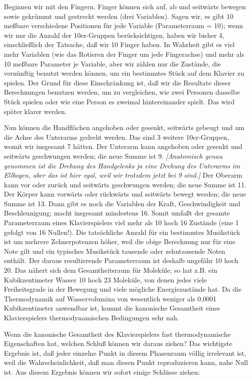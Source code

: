 Beginnen wir mit den Fingern.
Finger können sich auf, ab und seitwärts bewegen sowie gekrümmt und gestreckt werden (drei Variablen).
Sagen wir, es gibt 10 meßbare verschiedene Positionen für jede Variable (Parameterraum = 10); wenn wir nur die Anzahl der 10er-Gruppen berücksichtigen, haben wir bisher 4, einschließlich der Tatsache, daß wir 10 Finger haben.
In Wahrheit gibt es viel mehr Variablen (wie das Rotieren der Finger um jede Fingerachse) und mehr als 10 meßbare Parameter je Variable, aber wir zählen nur die Zustände, die vernünftig benutzt werden können, um ein bestimmtes Stück auf dem Klavier zu spielen.
Der Grund für diese Einschränkung ist, daß wir die Resultate dieser Berechnungen benutzen werden, um zu vergleichen, wie zwei Personen dasselbe Stück spielen oder wie eine Person es zweimal hintereinander spielt.
Das wird später klarer werden.

Nun können die Handflächen angehoben oder gesenkt, seitwärts gebeugt und um die Achse des Unterarms gedreht werden.
Das sind 3 weitere 10er-Gruppen, womit wir insgesamt 7 hätten.
Der Unterarm kann angehoben oder gesenkt und seitwärts geschwungen werden; die neue Summe ist 9.
\textit{[Anatomisch genau genommen ist die Drehung des Handgelenks ja eine Drehung des Unterarms im Ellbogen, aber das ist hier egal, weil wir trotzdem jetzt bei 9 sind.]}
Der Oberarm kann vor oder zurück und seitwärts geschwungen werden; die neue Summe ist 11.
Der Körper kann vorwärts oder rückwärts und seitwärts bewegt werden; die neue Summe ist 13.
Dann gibt es noch die Variablen der Kraft, Geschwindigkeit und Beschleunigung; macht insgesamt mindestens 16.
Somit umfaßt der gesamte Parameterraum eines Klavierspielers viel mehr als 10 hoch 16 Zustände (eine 1 gefolgt von 16 Nullen!).
Die tatsächliche Anzahl für ein bestimmtes Musikstück ist um mehrere Zehnerpotenzen höher, weil die obige Berechnung nur für eine Note gilt und ein typisches Musikstück tausende oder zehntausende Noten enthält.
Der daraus resultierende Parameterraum ist deshalb ungefähr 10 hoch 20.
Das nähert sich dem Gesamtheitsraum für Moleküle; so hat z.B. ein Kubikzentimeter Wasser 10 hoch 23 Moleküle, von denen jedes viele Freiheitsgrade in der Bewegung und viele mögliche Energiezustände hat.
Da die Thermodynamik auf Wasservolumina von wesentlich weniger als 0,0001 Kubikzentimeter anwendbar ist, kommt die kanonische Gesamtheit eines Klavierspielers thermodynamischen Bedingungen sehr nah.

Wenn die kanonische Gesamtheit des Klavierspielers fast thermodynamische Eigenschaften hat, welchen Schluß können wir daraus ziehen?
Das wichtigste Ergebnis ist, daß jeder einzelne Punkt in diesem Phasenraum völlig irrelevant ist, weil die Wahrscheinlichkeit, daß man diesen Punkt reproduzieren kann, nahe Null ist.
Aus diesem Ergebnis können wir sofort einige Schlüsse ziehen:

